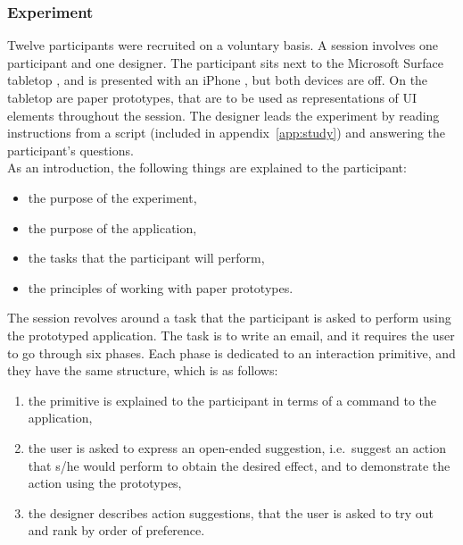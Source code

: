 \subsubsection{Experiment}

Twelve participants were recruited on a voluntary basis.
A session involves one participant and one designer.
The participant sits next to the Microsoft Surface tabletop \citep{ms}, and is presented with an iPhone \citep{iphone}, but both devices are off.
On the tabletop are paper prototypes, that are to be used as representations of UI elements throughout the session.
The designer leads the experiment by reading instructions from a script (included in appendix~\ref{app:study}) and answering the participant's questions.
\\
\linebreak
As an introduction, the following things are explained to the participant:
\begin{itemize}
\item the purpose of the experiment,
\item the purpose of the application,
\item the tasks that the participant will perform,
\item the principles of working with paper prototypes.
\end{itemize}
\hfill
\linebreak
The session revolves around a task that the participant is asked to perform using the prototyped application.
The task is to write an email, and it requires the user to go through six phases.
Each phase is dedicated to an interaction primitive, and they have the same structure, which is as follows:
\begin{enumerate}
\item the primitive is explained to the participant in terms of a command to the application,
\item the user is asked to express an open-ended suggestion, i.e.\ suggest an action that s/he would perform to obtain the desired effect, and to demonstrate the action using the prototypes,
\item the designer describes action suggestions, that the user is asked to try out and rank by order of preference.
\end{enumerate}


